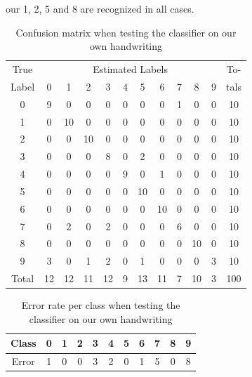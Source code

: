 \documentclass[%
        compressed,
        final,
        notitlepage,
        narroweqnarray,
        inline,
        twoside,
        ]{ieee}
\begin{document}
our 1, 2, 5 and 8 are recognized in all cases.
\begin{table}
    \centering
    \begin{tabular}{|c|cccccccccc | c|}
        \hline 
        True   & \multicolumn{10}{c|}{Estimated Labels} & To-\\
        Label & 0 & 1 & 2 & 3 & 4 & 5 & 6 & 7 & 8 & 9 & tals \\
        \hline
        0 & 9 & 0  & 0  & 0 & 0 & 0  & 0  & 1 & 0  & 0 & 10 \\
        1 & 0 & 10 & 0  & 0 & 0 & 0  & 0  & 0 & 0  & 0 & 10 \\
        2 & 0 & 0  & 10 & 0 & 0 & 0  & 0  & 0 & 0  & 0 & 10 \\
        3 & 0 & 0  & 0  & 8 & 0 & 2  & 0  & 0 & 0  & 0 & 10 \\
        4 & 0 & 0  & 0  & 0 & 9 & 0  & 1  & 0 & 0  & 0 & 10 \\
        5 & 0 & 0  & 0  & 0 & 0 & 10 & 0  & 0 & 0  & 0 & 10 \\
        6 & 0 & 0  & 0  & 0 & 0 & 0  & 10 & 0 & 0  & 0 & 10 \\
        7 & 0 & 2  & 0  & 2 & 0 & 0  & 0  & 6 & 0  & 0 & 10 \\
        8 & 0 & 0  & 0  & 0 & 0 & 0  & 0  & 0 & 10 & 0 & 10 \\
        9 & 3 & 0  & 1  & 2 & 0 & 1  & 0  & 0 & 0  & 3 & 10 \\
        \hline 
        Total & 12 & 12 & 11 & 12 & 9 & 13 & 11 & 7 & 10 & 3 & 100 \\
        \hline 
    \end{tabular}
    \caption{Confusion matrix when testing the classifier on our own handwriting}
    \label{tab:confmatrix}
\end{table}

\begin{table}
    \centering
    \begin{tabular}{|c|cccccccccc|}
        \hline
        Class & 0 & 1 & 2 & 3 & 4 & 5 & 6 & 7 & 8 & 9 \\
        \hline
        Error & 1 & 0 & 0 & 3 & 2 & 0 & 1 & 5 & 0 & 8 \\
        \hline
    \end{tabular}
    \caption{Error rate per class when testing the classifier on our own
    handwriting}
    \label{tab:errorrate}
\end{table}

\printbibliography
\end{document}
